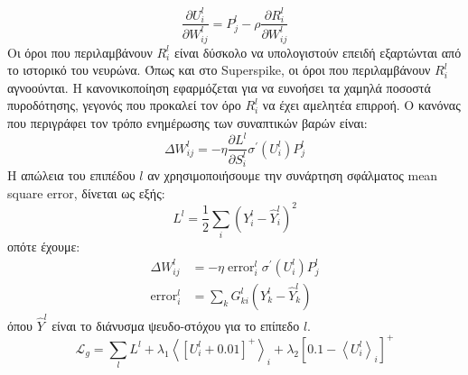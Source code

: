 \documentclass[12pt]{report}
\begin{document}
\begin{equation}
\frac{\partial U_{i}^{l}}{\partial W_{i j}^{l}}=P_{j}^{l}-\rho \frac{\partial R_{i}^{l}}{\partial W_{i j}^{l}}
\end{equation}
Οι όροι που περιλαμβάνουν $R_{i}^{l}$ είναι δύσκολο να υπολογιστούν επειδή εξαρτώνται από το ιστορικό του νευρώνα. Όπως και στο \textlatin{Superspike}, οι όροι που περιλαμβάνουν $R_{i}^{l}$ αγνοούνται. Η κανονικοποίηση εφαρμόζεται για να ευνοήσει τα χαμηλά ποσοστά πυροδότησης, γεγονός που προκαλεί τον όρο $R_{i}^{l}$ να έχει αμελητέα επιρροή. Ο κανόνας που περιγράφει τον τρόπο ενημέρωσης των συναπτικών βαρών είναι:
\begin{equation}
\Delta W_{i j}^{l}=-\eta \frac{\partial L^{l}}{\partial S_{i}^{l}} \sigma^{\prime}\left(U_{i}^{l}\right) P_{j}^{l}
\end{equation}
Η απώλεια του επιπέδου $l$ αν χρησιμοποιήσουμε την συνάρτηση σφάλματος \textlatin{mean square error}, δίνεται ως εξής:
\begin{equation}
L^{l}=\frac{1}{2} \sum_{i}\left(Y_{i}^{l}-\hat{Y}_{i}^{l}\right)^{2}
\end{equation}
οπότε έχουμε:
\begin{equation}
\begin{aligned}
\Delta W_{i j}^{l} &=-\eta \operatorname{error}_{i}^{l} \sigma^{\prime}\left(U_{i}^{l}\right) P_{j}^{l} \\
\operatorname{error}_{i}^{l} &=\sum_{k} G_{k i}^{l}\left(Y_{k}^{l}-\hat{Y}_{k}^{l}\right)
\end{aligned}
\end{equation}
όπου $\hat{Y}^{l}$  είναι το διάνυσμα ψευδο-στόχου για το επίπεδο $l$.
\begin{equation}
\mathcal{L}_{g}=\sum_{l} L^{l}+\lambda_{1}\left\langle\left[U_{i}^{l}+0.01\right]^{+}\right\rangle_{i}+\lambda_{2}\left[0.1-\left\langle U_{i}^{l}\right\rangle_{i}\right]^{+}
\end{equation}
\end{document}
